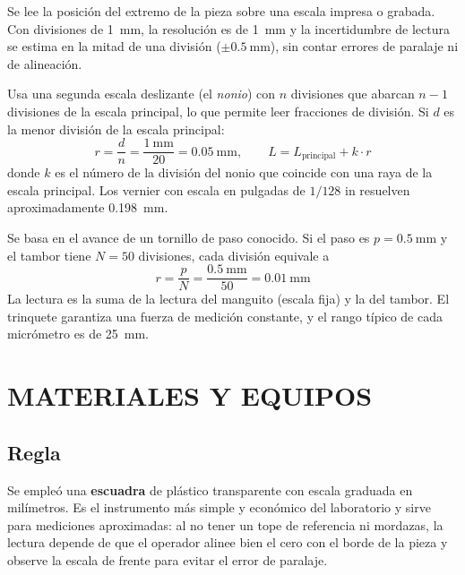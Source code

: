 \documentclass[12pt,a4paper]{article}
\begin{document}
\begin{description}[leftmargin=0pt,style=unboxed,labelindent=0pt]
	\item[Regla y escuadra graduadas.] Se lee la posición del extremo de la pieza
	      sobre una escala impresa o grabada. Con divisiones de
	      \SI{1}{\milli\metre}, la
	      resolución es de \SI{1}{\milli\metre} y la incertidumbre de lectura se
	      estima en la mitad de una división ($\pm\SI{0.5}{\milli\metre}$), sin
	      contar errores de paralaje ni de alineación.\\[-4pt]
	\item[Vernier o pie de rey.] Usa una segunda escala deslizante (el
	      \emph{nonio}) con $n$ divisiones que abarcan $n-1$ divisiones de la
	      escala principal, lo que permite leer fracciones de división. Si $d$ es
	      la menor división de la escala principal:
	      \[
		      r = \frac{d}{n} = \frac{\SI{1}{\milli\metre}}{20} =
		      \SI{0.05}{\milli\metre},
		      \qquad L = L_{\text{principal}} + k\cdot r
	      \]
	      donde $k$ es el número de la división del nonio que coincide con una
	      raya de la escala principal. Los vernier con escala en pulgadas de
	      $1/128$ in resuelven aproximadamente \SI{0.198}{\milli\metre}.\\[-4pt]
	\item[Micrómetro de exteriores.] Se basa en el avance de un tornillo de paso
	      conocido. Si el paso es $p = \SI{0.5}{\milli\metre}$ y el tambor tiene
	      $N = 50$
	      divisiones, cada división equivale a
	      \[
		      r = \frac{p}{N} = \frac{\SI{0.5}{\milli\metre}}{50} =
		      \SI{0.01}{\milli\metre}
	      \]
	      La lectura es la suma de la lectura del manguito (escala fija) y la del
	      tambor. El trinquete garantiza una fuerza de medición constante, y el
	      rango típico de cada micrómetro es de \SI{25}{\milli\metre}.
\end{description}


\section{MATERIALES Y EQUIPOS}

\subsection{Regla}

Se empleó una \textbf{escuadra} de plástico transparente con escala graduada en
milímetros. Es el instrumento más simple y económico del laboratorio y sirve
para mediciones aproximadas: al no tener un tope de referencia ni mordazas, la
lectura depende de que el operador alinee bien el cero con el borde de la pieza
y observe la escala de frente para evitar el error de paralaje.
\end{document}
